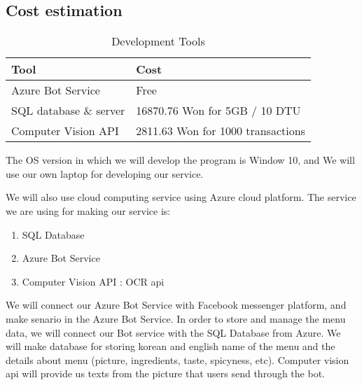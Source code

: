 \subsection{Cost estimation}
\begin{table}[htb]
\caption{Development Tools}
\begin{tabularx}{\linewidth}{|X|X|}
\toprule
Tool & Cost \\
\midrule
Azure Bot Service & Free \\
SQL database \& server & 16870.76 Won  for 5GB / 10 DTU\\
Computer Vision API & 2811.63 Won for 1000 transactions\\
\end{tabularx}
\end{table}
\FloatBarrier

The OS version in which we will develop the program is Window 10, and We will use our own laptop for developing our service.

We will also use cloud computing service using Azure cloud platform. 
The service we are using for making our service is:
\begin{enumerate}
\item SQL Database 
\item Azure Bot Service
\item Computer Vision API : OCR api
\end{enumerate}
We will connect our Azure Bot Service with Facebook messenger platform, and make senario in the Azure Bot Service. 
In order to store and manage the menu data, we will connect our Bot service with the SQL Database from Azure. We will make database for storing korean and english name of the menu and the details about menu (picture, ingredients, taste, spicyness, etc).
Computer vision api will provide us texts from the picture that users send through the bot.
